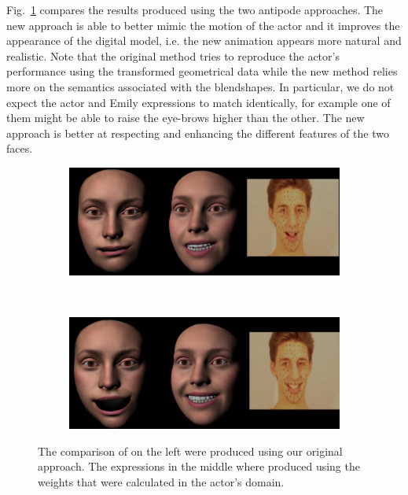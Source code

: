 \documentclass[11pt]{report}
\begin{document}
Fig.~\ref{fig:resultcomp} compares the results produced using the two antipode approaches. The new approach is able to better mimic the motion of the actor and it improves the appearance of the digital model, i.e. the new animation appears more natural and realistic. Note that the original method tries to reproduce the actor's performance using the transformed geometrical data while the new method relies more on the semantics associated with the blendshapes. In particular, we do not expect the actor and Emily expressions to match identically, for example one of them might be able to raise the eye-brows higher than the other. The new approach is better at respecting and enhancing the different features of the two faces. 
\begin{figure}[htbp!]
        \centering
        \begin{subfigure}[b]{0.6\textwidth}
                \includegraphics[width=\textwidth]{img/comp4s.png}
        \end{subfigure} \\
        \begin{subfigure}[b]{0.6\textwidth}
                \includegraphics[width=\textwidth]{img/comp6s.png}
        \end{subfigure}
        \caption{The comparison of on the left were produced using our original approach. The expressions in the middle where produced using the weights that were calculated in the actor's domain. }\label{fig:resultcomp}
\end{figure}
\end{document}
